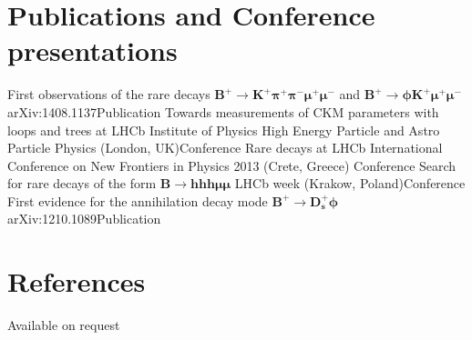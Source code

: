 \section{Publications and Conference presentations}

{First observations of the rare decays
  $\boldsymbol{B^+\!\to K^+\pi^+\pi^-\mu^+\mu^-}$ and
  $\boldsymbol{B^+\!\to\phi K^+\mu^+\mu^-}$}
  {arXiv:1408.1137}{Publication}
{Towards measurements of CKM parameters with loops and trees at LHCb}
{Institute of Physics High Energy Particle and Astro Particle
Physics (London, UK)}{Conference}
{Rare decays at LHCb}
{International Conference on New Frontiers in Physics 2013 (Crete, Greece)}
{Conference}
{Search for rare decays of the form $\boldsymbol{B\to hhh\mu\mu}$}
{LHCb week (Krakow, Poland)}{Conference}
{First evidence for the annihilation decay mode $\boldsymbol{B^+\!\to D_s^+\phi}$}
{arXiv:1210.1089}{Publication}






\section{References}
Available on request



